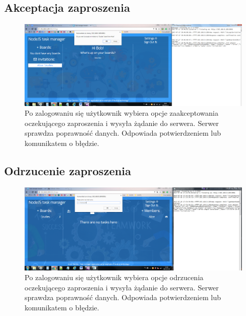 \documentclass[12pt]{report}
\begin{document}
\subsection{Akceptacja zaproszenia}
\begin{figure}[!hb]
\centering
\includegraphics[width=\textwidth,height=\textheight,keepaspectratio]{82.png}
\captionsetup{labelformat=empty}
\caption[]{Po zalogowaniu się użytkownik wybiera opcje zaakceptowania oczekującego zaproszenia i wysyła żądanie do serwera. 
Serwer sprawdza poprawność danych. Odpowiada potwierdzeniem lub komunikatem o błędzie.}
\end{figure}

\subsection{Odrzucenie zaproszenia}
\begin{figure}[!hb]
\centering
\includegraphics[width=\textwidth,height=\textheight,keepaspectratio]{A2.png}
\captionsetup{labelformat=empty}
\caption[]{Po zalogowaniu się użytkownik wybiera opcje odrzucenia oczekującego zaproszenia i wysyła żądanie do serwera. Serwer sprawdza poprawność danych. Odpowiada potwierdzeniem lub komunikatem o błędzie.}
\end{figure}

\newpage 
\end{document}

